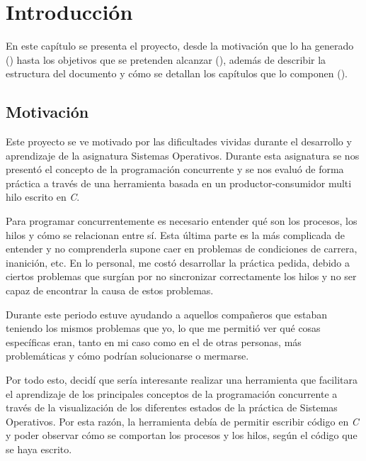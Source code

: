 \chapter{Introducción}\label{chap:introduccion}
En este capítulo se presenta el proyecto, desde la motivación que lo ha generado () hasta los objetivos que se pretenden alcanzar (), además de describir la estructura del documento y cómo se detallan los capítulos que lo componen ().

\section{Motivación}\label{sec:motivacion}
Este proyecto se ve motivado por las dificultades vividas durante el desarrollo y aprendizaje de la asignatura Sistemas Operativos. Durante esta asignatura se nos presentó el concepto de la programación concurrente y se nos evaluó de forma práctica a través de una herramienta basada en un productor-consumidor multi hilo escrito en \textit{C}.

Para programar concurrentemente es necesario entender qué son los procesos, los hilos y cómo se relacionan entre sí.
Esta última parte es la más complicada de entender y no comprenderla supone caer en problemas de condiciones de carrera, inanición, etc.
En lo personal, me costó desarrollar la práctica pedida, debido a ciertos problemas que surgían por no sincronizar correctamente los hilos y no ser capaz de encontrar la causa de estos problemas.

Durante este periodo estuve ayudando a aquellos compañeros que estaban teniendo los mismos problemas que yo, lo que me permitió ver qué cosas específicas eran, tanto en mi caso como en el de otras personas, más problemáticas y cómo podrían solucionarse o mermarse.

Por todo esto, decidí que sería interesante realizar una herramienta que facilitara el aprendizaje de los principales conceptos de la programación concurrente a través de la visualización de los diferentes estados de la práctica de Sistemas Operativos. Por esta razón, la herramienta debía de permitir escribir código en \textit{C} y poder observar cómo se comportan los procesos y los hilos, según el código que se haya escrito.\\

